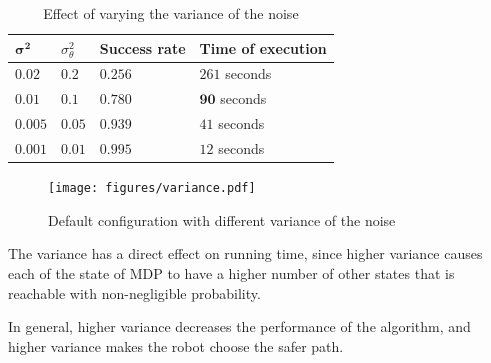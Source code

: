 \documentclass[10pt,a4paper,oneside]{article}
\begin{document}
\begin{table}
\begin{center}
\begin{tabular}{|  l | l | l | l | }
\hline
  $\mathbf{\sigma^2}$ & $\sigma_\theta^2$ & \textbf{Success rate} & \textbf{Time of execution} \\ \hline \hline
  $0.02$ & $0.2$ & $0.256$ & $261$ seconds \\ \hline  %
  $\mathbf{0.01}$ & $\mathbf{0.1}$ & $\mathbf{0.780}$ & $\mathbf{90}$ seconds \\ \hline
  $0.005$ & $0.05$ & $0.939$ & $41$ seconds \\ \hline  %
  $0.001$ & $0.01$ & $0.995$ & $12$ seconds \\ \hline  %
\end{tabular}
\end{center}
\caption{Effect of varying the variance of the noise}
\label{tab:variance}
\end{table}

%
%

\begin{figure}
\begin{center}
\texttt{[image: figures/variance.pdf]} 
\end{center}
\caption{Default configuration with different variance of the noise}
\label{fig:variance}
\end{figure}

The variance has a direct effect on running time, since higher variance
causes each of the state of MDP to have a higher number of other states
that is reachable with non-negligible probability.

In general, higher variance decreases the performance of the algorithm,
and higher variance makes the robot choose the safer path.
\end{document}
